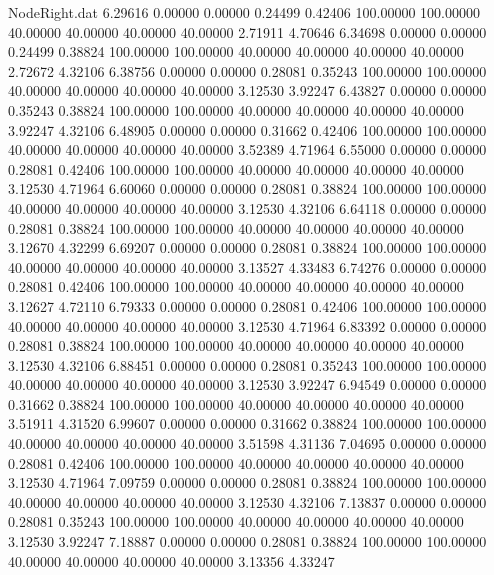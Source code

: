 \begin{filecontents}{NodeRight.dat}
   6.29616    0.00000    0.00000     0.24499    0.42406  100.00000  100.00000   40.00000   40.00000   40.00000   40.00000    2.71911    4.70646
   6.34698    0.00000    0.00000     0.24499    0.38824  100.00000  100.00000   40.00000   40.00000   40.00000   40.00000    2.72672    4.32106
   6.38756    0.00000    0.00000     0.28081    0.35243  100.00000  100.00000   40.00000   40.00000   40.00000   40.00000    3.12530    3.92247
   6.43827    0.00000    0.00000     0.35243    0.38824  100.00000  100.00000   40.00000   40.00000   40.00000   40.00000    3.92247    4.32106
   6.48905    0.00000    0.00000     0.31662    0.42406  100.00000  100.00000   40.00000   40.00000   40.00000   40.00000    3.52389    4.71964
   6.55000    0.00000    0.00000     0.28081    0.42406  100.00000  100.00000   40.00000   40.00000   40.00000   40.00000    3.12530    4.71964
   6.60060    0.00000    0.00000     0.28081    0.38824  100.00000  100.00000   40.00000   40.00000   40.00000   40.00000    3.12530    4.32106
   6.64118    0.00000    0.00000     0.28081    0.38824  100.00000  100.00000   40.00000   40.00000   40.00000   40.00000    3.12670    4.32299
   6.69207    0.00000    0.00000     0.28081    0.38824  100.00000  100.00000   40.00000   40.00000   40.00000   40.00000    3.13527    4.33483
   6.74276    0.00000    0.00000     0.28081    0.42406  100.00000  100.00000   40.00000   40.00000   40.00000   40.00000    3.12627    4.72110
   6.79333    0.00000    0.00000     0.28081    0.42406  100.00000  100.00000   40.00000   40.00000   40.00000   40.00000    3.12530    4.71964
   6.83392    0.00000    0.00000     0.28081    0.38824  100.00000  100.00000   40.00000   40.00000   40.00000   40.00000    3.12530    4.32106
   6.88451    0.00000    0.00000     0.28081    0.35243  100.00000  100.00000   40.00000   40.00000   40.00000   40.00000    3.12530    3.92247
   6.94549    0.00000    0.00000     0.31662    0.38824  100.00000  100.00000   40.00000   40.00000   40.00000   40.00000    3.51911    4.31520
   6.99607    0.00000    0.00000     0.31662    0.38824  100.00000  100.00000   40.00000   40.00000   40.00000   40.00000    3.51598    4.31136
   7.04695    0.00000    0.00000     0.28081    0.42406  100.00000  100.00000   40.00000   40.00000   40.00000   40.00000    3.12530    4.71964
   7.09759    0.00000    0.00000     0.28081    0.38824  100.00000  100.00000   40.00000   40.00000   40.00000   40.00000    3.12530    4.32106
   7.13837    0.00000    0.00000     0.28081    0.35243  100.00000  100.00000   40.00000   40.00000   40.00000   40.00000    3.12530    3.92247
   7.18887    0.00000    0.00000     0.28081    0.38824  100.00000  100.00000   40.00000   40.00000   40.00000   40.00000    3.13356    4.33247

\end{filecontents}
